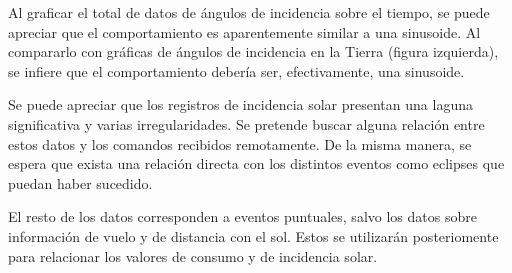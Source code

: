\documentclass[../Main.tex]{subfiles}
\begin{document}
Al graficar el total de datos de ángulos de incidencia sobre el tiempo, se puede apreciar que el comportamiento es aparentemente similar a una sinusoide. Al compararlo con gráficas de ángulos de incidencia en la Tierra (figura izquierda), se infiere que el comportamiento debería ser, efectivamente, una sinusoide. 
\newline \par 
Se puede apreciar que los registros de incidencia solar presentan una laguna significativa y varias irregularidades. Se pretende buscar alguna relación entre estos datos y los comandos recibidos remotamente. De la misma manera, se espera que exista una relación directa con los distintos eventos como eclipses que puedan haber sucedido.
\newline \par
El resto de los datos corresponden a eventos puntuales, salvo los datos sobre información de vuelo y de distancia con el sol. Estos se utilizarán posteriomente para relacionar los valores de consumo y de incidencia solar.
\end{document}
